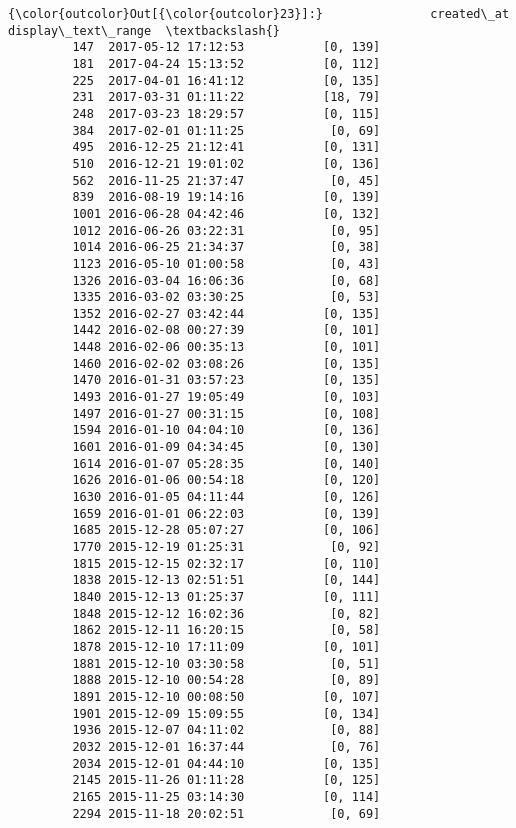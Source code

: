 \documentclass[11pt]{article}
\begin{document}
\begin{Verbatim}[commandchars=\\\{\}]
{\color{outcolor}Out[{\color{outcolor}23}]:}               created\_at display\_text\_range  \textbackslash{}
         147  2017-05-12 17:12:53           [0, 139]   
         181  2017-04-24 15:13:52           [0, 112]   
         225  2017-04-01 16:41:12           [0, 135]   
         231  2017-03-31 01:11:22           [18, 79]   
         248  2017-03-23 18:29:57           [0, 115]   
         384  2017-02-01 01:11:25            [0, 69]   
         495  2016-12-25 21:12:41           [0, 131]   
         510  2016-12-21 19:01:02           [0, 136]   
         562  2016-11-25 21:37:47            [0, 45]   
         839  2016-08-19 19:14:16           [0, 139]   
         1001 2016-06-28 04:42:46           [0, 132]   
         1012 2016-06-26 03:22:31            [0, 95]   
         1014 2016-06-25 21:34:37            [0, 38]   
         1123 2016-05-10 01:00:58            [0, 43]   
         1326 2016-03-04 16:06:36            [0, 68]   
         1335 2016-03-02 03:30:25            [0, 53]   
         1352 2016-02-27 03:42:44           [0, 135]   
         1442 2016-02-08 00:27:39           [0, 101]   
         1448 2016-02-06 00:35:13           [0, 101]   
         1460 2016-02-02 03:08:26           [0, 135]   
         1470 2016-01-31 03:57:23           [0, 135]   
         1493 2016-01-27 19:05:49           [0, 103]   
         1497 2016-01-27 00:31:15           [0, 108]   
         1594 2016-01-10 04:04:10           [0, 136]   
         1601 2016-01-09 04:34:45           [0, 130]   
         1614 2016-01-07 05:28:35           [0, 140]   
         1626 2016-01-06 00:54:18           [0, 120]   
         1630 2016-01-05 04:11:44           [0, 126]   
         1659 2016-01-01 06:22:03           [0, 139]   
         1685 2015-12-28 05:07:27           [0, 106]   
         1770 2015-12-19 01:25:31            [0, 92]   
         1815 2015-12-15 02:32:17           [0, 110]   
         1838 2015-12-13 02:51:51           [0, 144]   
         1840 2015-12-13 01:25:37           [0, 111]   
         1848 2015-12-12 16:02:36            [0, 82]   
         1862 2015-12-11 16:20:15            [0, 58]   
         1878 2015-12-10 17:11:09           [0, 101]   
         1881 2015-12-10 03:30:58            [0, 51]   
         1888 2015-12-10 00:54:28            [0, 89]   
         1891 2015-12-10 00:08:50           [0, 107]   
         1901 2015-12-09 15:09:55           [0, 134]   
         1936 2015-12-07 04:11:02            [0, 88]   
         2032 2015-12-01 16:37:44            [0, 76]   
         2034 2015-12-01 04:44:10           [0, 135]   
         2145 2015-11-26 01:11:28           [0, 125]   
         2165 2015-11-25 03:14:30           [0, 114]   
         2294 2015-11-18 20:02:51            [0, 69]   
         

\end{Verbatim}
\end{document}
